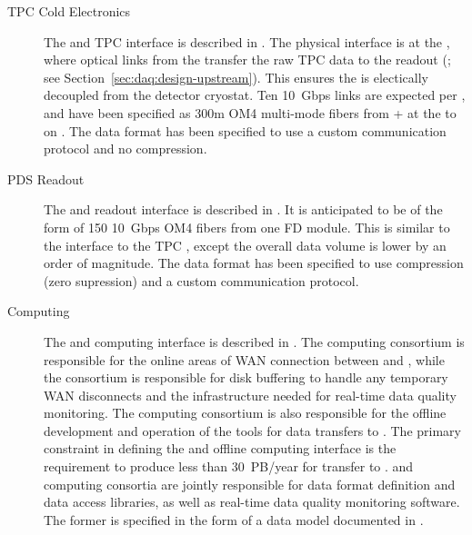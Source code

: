 \begin{description}
\item[TPC Cold Electronics] The  and TPC  interface is described in
. The physical interface is at the , where optical links from the  transfer
the raw TPC data to the   readout (; see
Section~\ref{sec:daq:design-upstream}). This ensures the  is electically decoupled from the detector
cryostat. Ten \SI{10}{Gbps} links are expected per , and have
been specified as 300m OM4 multi-mode fibers from + at the  to
 on . The data format has been specified
to use a custom communication protocol and no
compression.

\item[PDS Readout] The  and  readout interface is described in
. It is anticipated to
be of the form of 150  \SI{10}{Gbps} OM4 fibers from one FD module. 
This
is similar to the interface to the TPC , except the overall
data volume is lower by an order of magnitude. The data format has been specified to use
compression (zero supression) and a custom communication protocol.

\item[Computing] The  and computing interface is described in .
 The computing consortium %
 is responsible for the online areas of WAN connection between \surf and
\fnal, while the  consortium is responsible for disk buffering
to handle any temporary WAN disconnects and the infrastructure needed
for real-time data quality monitoring.  The computing consortium 
is also
responsible for the offline development and operation of the tools for data
transfers to \fnal. The primary
constraint in defining the  and offline computing interface is the
requirement to produce less than \SI{30}{PB/year} %
for transfer to
\fnal.  and %
computing consortia are jointly responsible for data
format definition and data access libraries, as well as real-time data
quality monitoring software. The former is specified in the form of a 
data model documented in .


\end{description}
